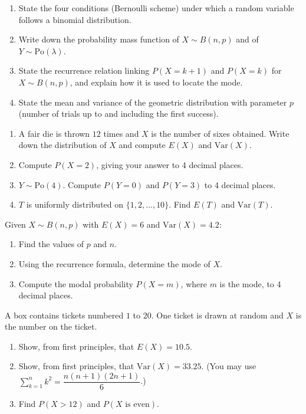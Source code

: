 \documentclass[11pt]{article}
\newcounter{popsec}
\newcounter{popsub}
\newcommand{\courssub}[1]{%
  \stepcounter{popsub}%
  \par\vspace{9pt}\noindent{\popxbold\fontsize{11.5}{13}\selectfont\color{popink}{\color{poporange}\thepopsec.\thepopsub}\hspace{6pt}#1}\par\nopagebreak\vspace{4pt}
}
\begin{document}
\begin{exercice}
\begin{enumerate}
\item State the four conditions (Bernoulli scheme) under which a random variable follows a binomial distribution.
\item Write down the probability mass function of $X \sim B(n, p)$ and of $Y \sim \mathrm{Po}(\lambda)$.
\item State the recurrence relation linking $P(X = k+1)$ and $P(X = k)$ for $X \sim B(n, p)$, and explain how it is used to locate the mode.
\item State the mean and variance of the geometric distribution with parameter $p$ (number of trials up to and including the first success).
\end{enumerate}
\end{exercice}

\begin{exercice}
\begin{enumerate}
\item A fair die is thrown $12$ times and $X$ is the number of sixes obtained. Write down the distribution of $X$ and compute $E(X)$ and $\mathrm{Var}(X)$.
\item Compute $P(X = 2)$, giving your answer to 4 decimal places.
\item $Y \sim \mathrm{Po}(4)$. Compute $P(Y = 0)$ and $P(Y = 3)$ to 4 decimal places.
\item $T$ is uniformly distributed on $\{1, 2, \dots, 10\}$. Find $E(T)$ and $\mathrm{Var}(T)$.
\end{enumerate}
\end{exercice}

\courssub{I practise}

\begin{exercice}
Given $X \sim B(n, p)$ with $E(X) = 6$ and $\mathrm{Var}(X) = 4.2$:
\begin{enumerate}
\item Find the values of $p$ and $n$.
\item Using the recurrence formula, determine the mode of $X$.
\item Compute the modal probability $P(X = m)$, where $m$ is the mode, to 4 decimal places.
\end{enumerate}
\end{exercice}

\begin{exercice}
A box contains tickets numbered $1$ to $20$. One ticket is drawn at random and $X$ is the number on the ticket.
\begin{enumerate}
\item Show, from first principles, that $E(X) = 10.5$.
\item Show, from first principles, that $\mathrm{Var}(X) = 33.25$. (You may use $\sum_{k=1}^{n} k^2 = \dfrac{n(n+1)(2n+1)}{6}$.)
\item Find $P(X > 12)$ and $P(X \text{ is even})$.
\end{enumerate}
\end{exercice}
\end{document}
